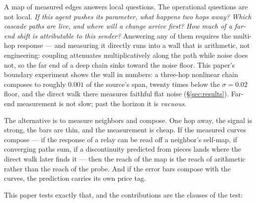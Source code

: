 \documentclass[11pt,a4paper]{article}
\begin{document}
A map of measured edges answers local questions. The operational
questions are not local. \emph{If this agent pushes its parameter, what
happens two hops away?} \emph{Which cascade paths are live, and where
will a change arrive first?} \emph{How much of a far-end shift is
attributable to this sender?} Answering any of them requires the
multi-hop response --- and measuring it directly runs into a wall that
is arithmetic, not engineering: coupling attenuates multiplicatively
along the path while noise does not, so the far end of a deep chain
sinks toward the noise floor. This paper's boundary experiment shows
the wall in numbers: a three-hop nonlinear chain composes to roughly
$0.001$ of the source's span, twenty times below the $\sigma{=}0.02$
floor, and the direct walk there measures faithful flat noise
(\S\ref{sec:results}). Far-end measurement is not slow; past the
horizon it is \emph{vacuous}.

The alternative is to measure neighbors and compose. One hop away, the
signal is strong, the bars are thin, and the measurement is cheap. If
the measured curves compose --- if the response of a relay can be read
off a neighbor's self-map, if converging paths sum, if a discontinuity
predicted from pieces lands where the direct walk later finds it ---
then the reach of the map is the reach of arithmetic rather than the
reach of the probe. And if the error bars compose with the curves, the
prediction carries its own price tag.

This paper tests exactly that, and the contributions are the clauses
of the test:
\end{document}
